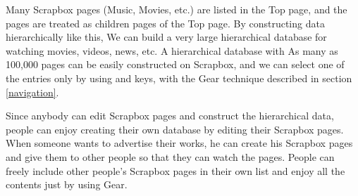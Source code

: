 \documentclass[conference]{IEEEtran}
\def\up{\tsf{▲}}
\def\down{\tsf{▼}}
\def\SB{Scrapbox}
\begin{document}
Many {\SB} pages (Music, Movies, etc.) are listed in the Top page, and
the pages are treated as children pages of the Top page.
By constructing data hierarchically like this,
We can build a very large hierarchical database for watching movies, videos, news, etc.
A hierarchical database with
As many as 100,000 pages can be easily constructed on {\SB}, and
we can select one of the entries only by using {\up} and {\down} keys,
with the Gear technique described in section \ref{navigation}.


Since anybody can edit {\SB} pages and construct the hierarchical data,
people can enjoy creating their own database by editing their {\SB} pages.
When someone wants to advertise their works,
he can create his {\SB} pages
and give them to other people so that they can watch the pages.
People can freely include other people's {\SB} pages in their own list
and enjoy all the contents just by using Gear.
\end{document}
